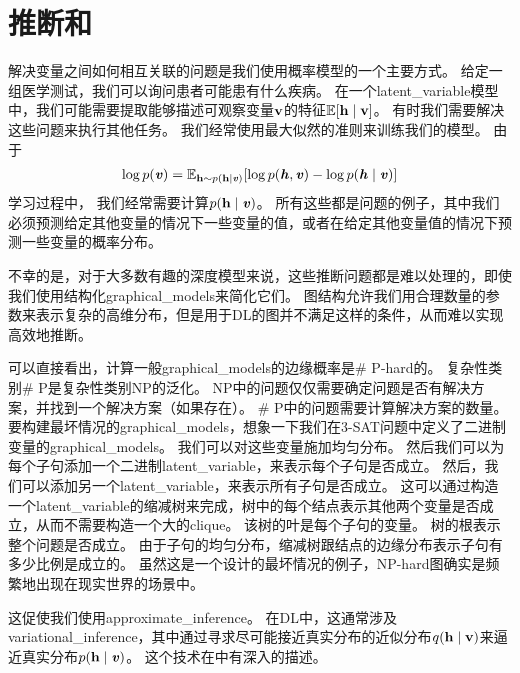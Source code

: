 \section{推断和}
\label{sec:inference_and_approximate_inference}


解决变量之间如何相互关联的问题是我们使用概率模型的一个主要方式。 
给定一组医学测试，我们可以询问患者可能患有什么疾病。
在一个\gls{latent_variable}模型中，我们可能需要提取能够描述可观察变量$\mathbf{v}$的特征$\mathbb{E}[\mathbf{h} \mid \mathbf{v}]$。
有时我们需要解决这些问题来执行其他任务。 
我们经常使用最大似然的准则来训练我们的模型。
由于
\begin{align}
\label{eqn:169}
\log p(\boldsymbol{\mathit{v}}) = \mathbb{E}_{\mathbf{h} \sim p(\mathbf{h}\mid \boldsymbol{\mathit{v}})} [\log p(\boldsymbol{\mathit{h}},\boldsymbol{\mathit{v}}) -  \log p(\boldsymbol{\mathit{h}}\mid\boldsymbol{\mathit{v}})]
\end{align}
学习过程中，%
我们经常需要计算$p(\mathbf{h}\mid\boldsymbol{\mathit{v}})$。
所有这些都是问题的例子，其中我们必须预测给定其他变量的情况下一些变量的值，或者在给定其他变量值的情况下预测一些变量的概率分布。

不幸的是，对于大多数有趣的深度模型来说，这些推断问题都是难以处理的，即使我们使用结构化\gls{graphical_models}来简化它们。
图结构允许我们用合理数量的参数来表示复杂的高维分布，但是用于\gls{DL}的图并不满足这样的条件，从而难以实现高效地推断。


可以直接看出，计算一般\gls{graphical_models}的边缘概率是\# P-hard的。
复杂性类别\# P是复杂性类别NP的泛化。
NP中的问题仅仅需要确定问题是否有解决方案，并找到一个解决方案（如果存在）。
\# P中的问题需要计算解决方案的数量。
要构建最坏情况的\gls{graphical_models}，想象一下我们在3-SAT问题中定义了二进制变量的\gls{graphical_models}。
我们可以对这些变量施加均匀分布。
然后我们可以为每个子句添加一个二进制\gls{latent_variable}，来表示每个子句是否成立。
然后，我们可以添加另一个\gls{latent_variable}，来表示所有子句是否成立。
这可以通过构造一个\gls{latent_variable}的缩减树来完成，树中的每个结点表示其他两个变量是否成立，从而不需要构造一个大的\gls{clique}。
该树的叶是每个子句的变量。
树的根表示整个问题是否成立。
由于子句的均匀分布，缩减树跟结点的边缘分布表示子句有多少比例是成立的。
虽然这是一个设计的最坏情况的例子，NP-hard图确实是频繁地出现在现实世界的场景中。


这促使我们使用\gls{approximate_inference}。
在\gls{DL}中，这通常涉及\gls{variational_inference}，其中通过寻求尽可能接近真实分布的近似分布$q(\mathbf{h}\mid\mathbf{v})$来逼近真实分布$p(\mathbf{h}\mid\boldsymbol{\mathit{v}})$。
这个技术在中有深入的描述。



